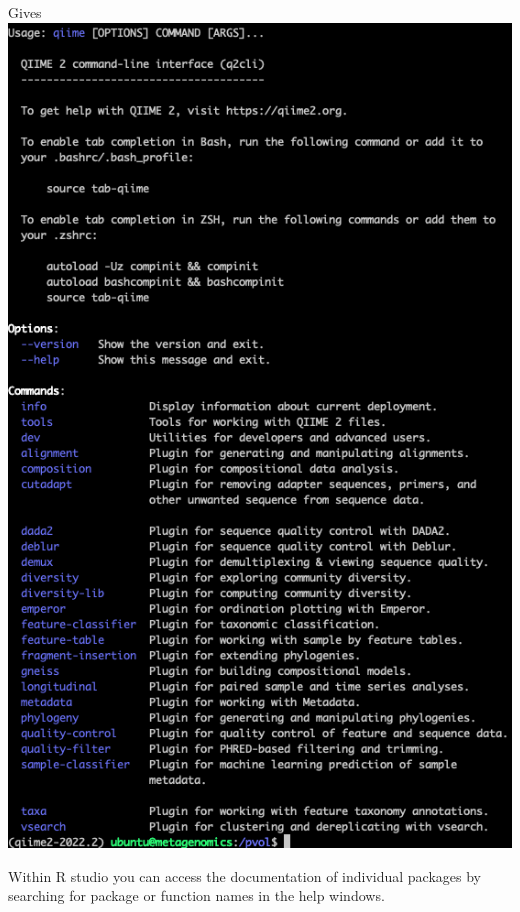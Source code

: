 \documentclass[
]{book}
\begin{document}
Gives\\
\includegraphics{./img/qiimehelp.png}

Within R studio you can access the documentation of individual packages by searching for package or function names in the help windows.
\end{document}
